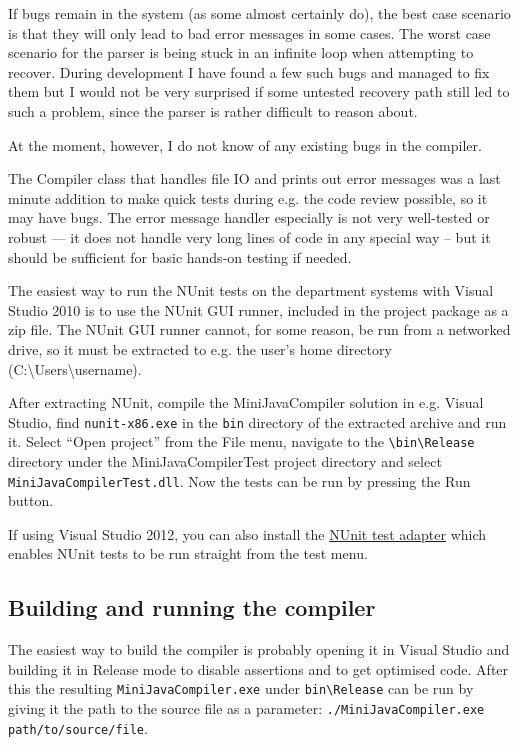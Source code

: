 \documentclass[a4paper,11pt]{article}
\begin{document}
If bugs remain in the system (as some almost certainly do), the best case scenario is that they will only lead to bad error messages in some cases. The worst case scenario for the parser is being stuck in an infinite loop when attempting to recover. During development I have found a few such bugs and managed to fix them but I would not be very surprised if some untested recovery path still led to such a problem, since the parser is rather difficult to reason about.

At the moment, however, I do not know of any existing bugs in the compiler.

The Compiler class that handles file IO and prints out error messages was a last minute addition to make quick tests during e.g. the code review possible, so it may have bugs. The error message handler especially is not very well-tested or robust --- it does not handle very long lines of code in any special way -- but it should be sufficient for basic hands-on testing if needed.

The easiest way to run the NUnit tests on the department systems with Visual Studio 2010 is to use the NUnit GUI runner, included in the project package as a zip file. The NUnit GUI runner cannot, for some reason, be run from a networked drive, so it must be extracted to e.g. the user's home directory (C:\textbackslash Users\textbackslash username).

After extracting NUnit, compile the MiniJavaCompiler solution in e.g. Visual Studio, find \verb,nunit-x86.exe, in the \verb,bin, directory of the extracted archive and run it. Select ``Open project'' from the File menu, navigate to the \verb,\bin\Release, directory under the MiniJavaCompilerTest project directory and select \verb,MiniJavaCompilerTest.dll,. Now the tests can be run by pressing the Run button.

If using Visual Studio 2012, you can also install the \href{http://nunit.org/index.php?p=vsTestAdapter&r=2.6.1}{NUnit test adapter} which enables NUnit tests to be run straight from the test menu.

\subsection{Building and running the compiler}

The easiest way to build the compiler is probably opening it in Visual Studio and building it in Release mode to disable assertions and to get optimised code. After this the resulting \verb,MiniJavaCompiler.exe, under \verb,bin\Release, can be run by giving it the path to the source file as a parameter: \verb,./MiniJavaCompiler.exe path/to/source/file,.
\end{document}
